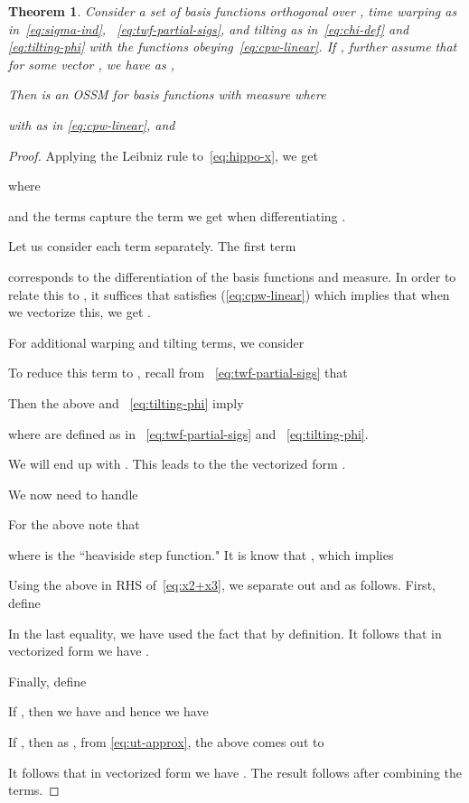 \documentclass{article}
\newtheorem{theorem}{Theorem}
\begin{document}
\begin{theorem}
Consider a set of basis functions  orthogonal over , time warping  as in~\eqref{eq:sigma-ind}, ~\eqref{eq:twf-partial-sigs}, and tilting  as in~\eqref{eq:chi-def} and \eqref{eq:tilting-phi} with the functions  obeying~\eqref{eq:cpw-linear}. If , further assume that for some vector ,  we have
as ,


Then  is an OSSM for basis functions  with measure  where

with  as in \eqref{eq:cpw-linear},
 and

\label{thm:gen-hippo-t0}
\end{theorem}
\begin{proof}


Applying the Leibniz rule to~\eqref{eq:hippo-x}, we get

where

and the  terms capture the term we get when differentiating .

Let us consider each term separately. The first term

 corresponds to the differentiation of the basis functions and measure. In order to relate this to , it suffices that  satisfies (\ref{eq:cpw-linear}) which implies that when we vectorize this, we get .

For additional warping and tilting terms, we consider



To reduce this term to , recall from ~\eqref{eq:twf-partial-sigs} that  








Then the above and ~\eqref{eq:tilting-phi} imply



where  are defined as in ~\eqref{eq:twf-partial-sigs} and ~\eqref{eq:tilting-phi}.

We will end up with . This leads to the the vectorized form . 

We now need to handle


For the above note that

where  is the ``heaviside step function." It is know that , which implies

Using the above in RHS of~\eqref{eq:x2+x3}, we separate out  and  as follows.
First, define


In the last equality, we have used the fact that   by definition.
 It follows that in vectorized form we have .

 Finally, define



If , then we have  and hence we have 

If , then as , from \eqref{eq:ut-approx}, the above comes out to

 

 It follows that in vectorized form we have . The result follows after combining the terms.


\end{proof}
\end{document}
